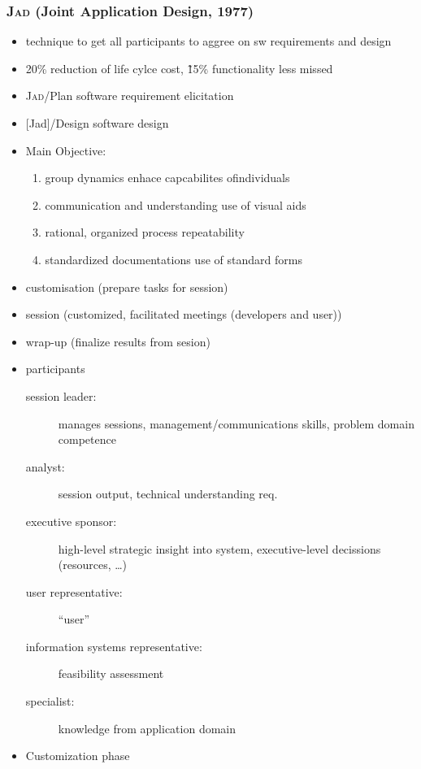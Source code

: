 \documentclass[a4paper, 10pt]{article}
\begin{document}
\subsubsection{\textsc{Jad} (Joint Application Design, 1977)}
\begin{itemize}
	\item technique to get all participants to aggree on sw requirements and design
	\item 20\% reduction of life cylce cost, \~15\% functionality less missed
	\item \textsc{Jad}/Plan \follows software requirement elicitation
	\item \textsc[Jad]/Design \follows software design
	\item Main Objective:
		\begin{enumerate}
			\item group dynamics \follows enhace capcabilites ofindividuals
			\item communication and understanding \follows use of visual 	aids
			\item rational, organized process \follows repeatability
			\item standardized documentations \follows use of standard forms
		\end{enumerate}
	\item customisation (prepare tasks for session)
	\item session (customized, facilitated meetings (developers and user))
	\item wrap-up (finalize results from sesion)
	\item participants
		\begin{description}
			\item[session leader:] manages sessions, management/communications skills, problem domain competence
			\item[analyst:] \follows session output, technical understanding req.
			\item[executive sponsor:] high-level strategic insight into system, executive-level decissions (resources, \dots)
			\item[user representative:] ``user''
			\item[information systems representative:] feasibility assessment
			\item[specialist:] knowledge from application domain
		\end{description}
	\item Customization phase
	\begin{itemize}

\end{itemize}
\end{itemize}
\end{document}
